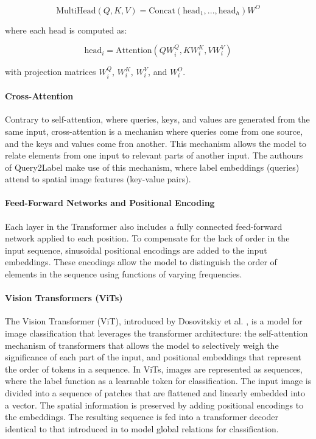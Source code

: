 \documentclass[lettersize,journal]{IEEEtran}
\begin{document}
\begin{equation}
    \text{MultiHead}(Q,K,V) = \text{Concat}(\text{head}_1, ..., \text{head}_h)W^O
\end{equation}
    
\noindent where each head is computed as:

\begin{equation}
    \text{head}_i = \text{Attention}(QW^Q_i, KW^K_i, VW^V_i)
\end{equation}

\noindent with projection matrices $W_i^Q$, $W_i^K$, $W_i^V$, and $W_i^O$.

\paragraph{Cross-Attention}
Contrary to self-attention, where queries, keys, and values are generated from the same input, cross-attention is a mechanisn where queries come from one source, and the keys and values come fron another. This mechanism allows the model to relate elements from one input to relevant parts of another input. The authours of Query2Label \cite{Query2Label} make use of this mechanism, where label embeddings (queries) attend to spatial image features (key-value pairs).

\paragraph{Feed-Forward Networks and Positional Encoding}
Each layer in the Transformer also includes a fully connected feed-forward network applied to each position. To compensate for the lack of order in the input sequence, sinusoidal positional encodings are added to the input embeddings. These encodings allow the model to distinguish the order of elements in the sequence using functions of varying frequencies.

\paragraph{Vision Transformers (ViTs)}
The Vision Transformer (ViT), introduced by Dosovitskiy et al. \cite{dosovitskiy2021imageworth16x16words}, is a model for image classification that leverages the transformer architecture: the self-attention mechanism of transformers that allows the model to selectively weigh the significance of each part of the input, and positional embeddings that represent the order of tokens in a sequence. In ViTs, images are represented as sequences, where the label function as a learnable token for classification. The input image is divided into a sequence of patches that are flattened and linearly embedded into a vector. The spatial information is preserved by adding positional encodings to the embeddings. The resulting sequence is fed into a transformer decoder identical to that introduced in \cite{vaswani2023attentionneed} to model global relations for classification.
\end{document}
